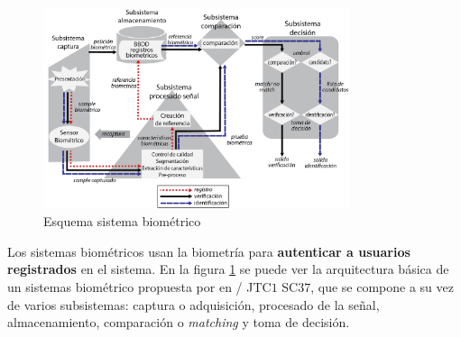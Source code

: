 \begin{figure}[t]
    \centering
    \includegraphics[width=0.8\textwidth]{ch-sistemasABC/images/ch-sistemasBiometricos/esquemaSistemaBiometricos.png}
    \caption{Esquema sistema biométrico \cite{ISO/Biometric}}
    \label{fig:esquemaSistemaBiometrico}
\end{figure}

Los sistemas biométricos usan la biometría para \textbf{autenticar a usuarios registrados} en el sistema. En la figura \ref{fig:esquemaSistemaBiometrico} se puede ver la arquitectura básica de un sistemas biométrico propuesta por en / JTC$1$ SC$37$, que se compone a su vez de varios subsistemas: captura o adquisición, procesado de la señal, almacenamiento, comparación o \textit{matching} y toma de decisión.

